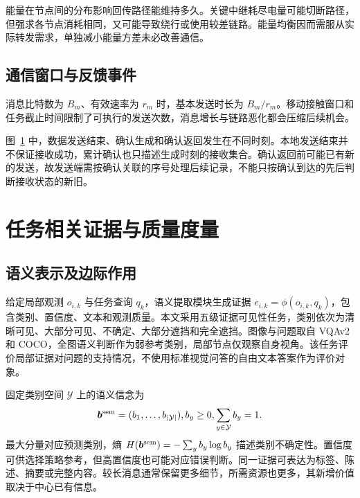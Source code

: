 能量在节点间的分布影响回传路径能维持多久。关键中继耗尽电量可能切断路径，但强求各节点消耗相同，又可能导致绕行或使用较差链路。能量均衡因而需服从实际转发需求，单独减小能量方差未必改善通信。

\subsection{通信窗口与反馈事件}

消息比特数为 $B_m$、有效速率为 $r_m$ 时，基本发送时长为 $B_m/r_m$。移动接触窗口和任务截止时间限制了可执行的发送次数，消息增长与链路恶化都会压缩后续机会。

\begin{figure}[htbp]
\centering

\label{fig:base:timeline}
\end{figure}
图~\ref{fig:base:timeline} 中，数据发送结束、确认生成和确认返回发生在不同时刻。本地发送结束并不保证接收成功，累计确认也只描述生成时刻的接收集合。确认返回前可能已有新的发送，故发送端需按确认关联的序号处理后续记录，不能只按确认到达的先后判断接收状态的新旧。

\section{任务相关证据与质量度量}
\subsection{语义表示及边际作用}

给定局部观测 $o_{i,k}$ 与任务查询 $q_k$，语义提取模块生成证据 $e_{i,k}=\phi(o_{i,k},q_k)$，包含类别、置信度、文本和观测质量。本文采用五级证据可见性任务，类别依次为清晰可见、大部分可见、不确定、大部分遮挡和完全遮挡。图像与问题取自 VQAv2 和 COCO，全图语义判断作为弱参考类别，局部节点仅观察自身视角。该任务评价局部证据对问题的支持情况，不使用标准视觉问答的自由文本答案作为评价对象。

固定类别空间 $\mathcal Y$ 上的语义信念为
\begin{equation}
\bm b^{\rm sem}=(b_1,\ldots,b_{|\mathcal Y|}),
b_y\ge0, \sum_{y\in\mathcal Y}b_y=1.
\label{eq:base:semantic-belief}
\end{equation}
最大分量对应预测类别，熵 $H(\bm b^{\rm sem})=-\sum_yb_y\log b_y$ 描述类别不确定性。置信度可供选择策略参考，但高置信度也可能对应错误判断。同一证据可表达为标签、陈述、摘要或完整内容。较长消息通常保留更多细节，所需资源也更多，其新增价值取决于中心已有信息。

